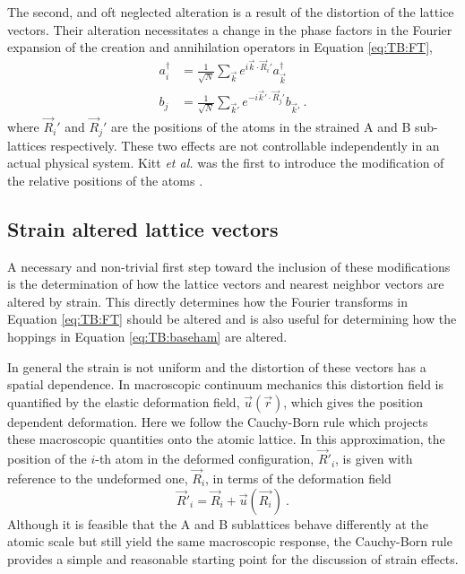 The second, and oft neglected alteration is a result of the distortion of the lattice vectors.
Their alteration necessitates a change in the phase factors in the Fourier expansion of the creation and annihilation operators in Equation \ref{eq:TB:FT},
\begin{align}
  a_i^{\dagger}&=\frac{1}{\sqrt{N}}\sum_{\vec{k} } e^{ i \vec{k}  \cdot \vec{R}_i'} a_{\vec{k} }^{\dagger} \nonumber \\
  b_j          &=\frac{1}{\sqrt{N}}\sum_{\vec{k}'} e^{-i \vec{k}' \cdot \vec{R}_j'} b_{\vec{k}'} \ . \label{eq:PVP:FT} 
\end{align}
where $\vec{R}_i'$ and $\vec{R}_j'$ are the positions of the atoms in the strained A and B sub-lattices respectively.
These two effects are not controllable independently in an actual physical system.
Kitt \textit{et al.} was the first to introduce the modification of the relative positions of the atoms \cite{Kitt2012}.

\subsection{Strain altered lattice vectors \label{sub:PVP:straindistances}}
A necessary and non-trivial first step toward the inclusion of these modifications is the determination of how the lattice vectors and nearest neighbor vectors are altered by strain.
This directly determines how the Fourier transforms in Equation \ref{eq:TB:FT} should be altered and is also useful for determining how the hoppings in Equation \ref{eq:TB:baseham} are altered.

In general the strain is not uniform and the distortion of these vectors has a spatial dependence.
In macroscopic continuum mechanics this distortion field is quantified by the elastic deformation field, $\vec{u}(\vec{r})$, which gives the position dependent deformation.
Here we follow the Cauchy-Born rule which projects these macroscopic quantities onto the atomic lattice.
In this approximation, the position of the $i$-th atom in the deformed configuration, $\vec{R}'_i$, is given with reference to the undeformed one, $\vec{R}_i$, in terms of the deformation field
\begin{equation*}
  \vec{R}'_{i}=\vec{R}_{i}+\vec{u}(\vec{R_i}) \ .
\end{equation*}
Although it is feasible that the A and B sublattices behave differently at the atomic scale but still yield the same macroscopic response, the Cauchy-Born rule provides a simple and reasonable starting point for the discussion of strain effects.

